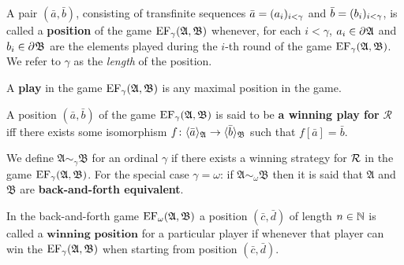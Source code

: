\begin{dfn}[Position]
	A pair $(\bar{a},\bar{b})$, consisting of transfinite sequences $\bar{a}=(a_i)_{i<\gamma}$ and $\bar{b}=(b_i)_{i<\gamma}$, is called a \textbf{position} of the game $\operatorname{EF}_\gamma(\mathfrak{A},\mathfrak{B})$ whenever, for each $i<\gamma$, $a_i\in\partial^{}{}\mathfrak{A}$ and $b_i\in\partial^{}{}\mathfrak{B}$ are the elements played during the $i$-th round of the game $\operatorname{EF}_\gamma(\mathfrak{A},\mathfrak{B})$.  We refer to $\gamma$ as the \textit{length} of the position.
\end{dfn}

\begin{dfn}[Play]
	A \textbf{play} in the game $\operatorname{EF}_\gamma(\mathfrak{A},\mathfrak{B})$ is any maximal position in the game.
\end{dfn}

\begin{dfn}
	A position $(\bar{a},\bar{b})$ of the game $\operatorname{EF}_\gamma(\mathfrak{A},\mathfrak{B})$ is said to be \textbf{a winning play for} $\bm{\mathcal{R}}$ iff there exists some isomorphism $f\colon\langle \bar{a}\rangle_{\mathfrak{A}}\to\langle \bar{b}\rangle_{\mathfrak{B}}$ such that $f[\bar{a}]=\bar{b}$.
\end{dfn}

\begin{dfn}
	We define $\mathfrak{A}\sim_\gamma\mathfrak{B}$ for an ordinal $\gamma$ if there exists a winning strategy for $\mathcal{R}$ in the game $\operatorname{EF}_\gamma(\mathfrak{A},\mathfrak{B})$.  For the special case $\gamma=\omega$: if $\mathfrak{A}\sim_\omega\mathfrak{B}$ then it is said that $\mathfrak{A}$ and $\mathfrak{B}$ are \textbf{back-and-forth equivalent}.
\end{dfn}

\begin{dfn}
	In the back-and-forth game $\operatorname{EF}_\omega(\mathfrak{A},\mathfrak{B})$ a position $(\bar{c},\bar{d})$ of length $n\in\mathbb{N}$ is called a $\textbf{winning position}$ for a particular player if whenever that player can win the $\operatorname{EF}_\gamma(\mathfrak{A},\mathfrak{B})$ when starting from position $(\bar{c},\bar{d})$.
\end{dfn}

